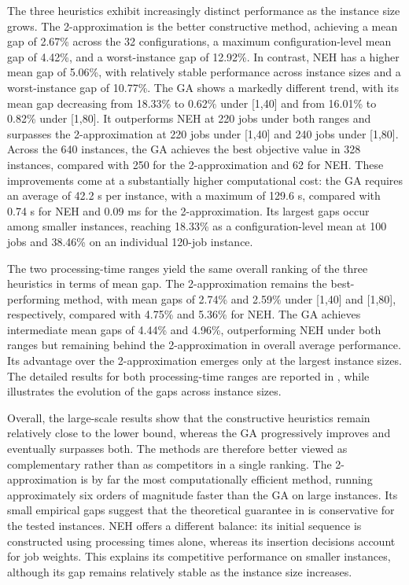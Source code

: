 ﻿\documentclass[12pt]{article}
\begin{document}
\begin{sloppypar}
The three heuristics exhibit increasingly distinct performance as the instance size grows. 
The 2-approximation is the better constructive method, achieving a mean gap of 2.67\% across the 32 configurations, 
a maximum configuration-level mean gap of 4.42\%, and a worst-instance gap of 12.92\%. 
In contrast, NEH has a higher mean gap of 5.06\%, with relatively stable performance across instance sizes 
and a worst-instance gap of 10.77\%. The GA shows a markedly different trend, 
with its mean gap decreasing from 18.33\% to 0.62\% under [1,40] and from 16.01\% to 0.82\% under [1,80]. 
It outperforms NEH at 220 jobs under both ranges and surpasses the 2-approximation at 220 jobs under [1,40] 
and 240 jobs under [1,80]. Across the 640 instances, the GA achieves the best objective value in 328 instances, 
compared with 250 for the 2-approximation and 62 for NEH. 
These improvements come at a substantially higher computational cost: 
the GA requires an average of 42.2 s per instance, with a maximum of 129.6 s, 
compared with 0.74 s for NEH and 0.09 ms for the 2-approximation. Its largest gaps occur among smaller instances, 
reaching 18.33\% as a configuration-level mean at 100 jobs and 38.46\% on an individual 120-job instance.

The two processing-time ranges yield the same overall ranking of the three heuristics in terms of mean gap. 
The 2-approximation remains the best-performing method, with mean gaps of 2.74\% and 2.59\% under [1,40] and [1,80], 
respectively, compared with 4.75\% and 5.36\% for NEH. The GA achieves intermediate mean gaps of 4.44\% and 4.96\%, 
outperforming NEH under both ranges but remaining behind the 2-approximation in overall average performance. 
Its advantage over the 2-approximation emerges only at the largest instance sizes. 
The detailed results for both processing-time ranges are reported in , 
while  illustrates the evolution of the gaps across instance sizes.

Overall, the large-scale results show that the constructive heuristics remain relatively close to the lower bound, 
whereas the GA progressively improves and eventually surpasses both. 
The methods are therefore better viewed as complementary rather than as competitors in a single ranking. 
The 2-approximation is by far the most computationally efficient method, 
running approximately six orders of magnitude faster than the GA on large instances. 
Its small empirical gaps suggest that the theoretical guarantee in  is conservative for the tested instances. 
NEH offers a different balance: its initial sequence is constructed using processing times alone, 
whereas its insertion decisions account for job weights. 
This explains its competitive performance on smaller instances, 
although its gap remains relatively stable as the instance size increases.


\end{sloppypar}
\end{document}
